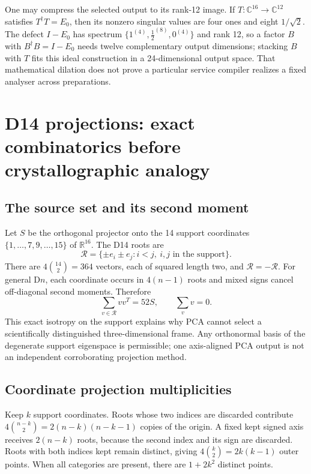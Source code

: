 \documentclass[11pt,a4paper]{article}
\begin{document}
One may compress the selected output to its rank-12 image. If $T:\mathbb C^{16}\to\mathbb C^{12}$ satisfies $T^\dagger T=E_0$, then its nonzero singular values are four ones and eight $1/\sqrt2$. The defect $I-E_0$ has spectrum $\{1^{(4)},\tfrac12^{(8)},0^{(4)}\}$ and rank 12, so a factor $B$ with $B^\dagger B=I-E_0$ needs twelve complementary output dimensions; stacking $B$ with $T$ fits this ideal construction in a 24-dimensional output space. That mathematical dilation does not prove a particular service compiler realizes a fixed analyser across preparations.

\section{D14 projections: exact combinatorics before crystallographic analogy}
\subsection{The source set and its second moment}
Let $S$ be the orthogonal projector onto the 14 support coordinates $\{1,\ldots,7,9,\ldots,15\}$ of $\mathbb R^{16}$. The D14 roots are
\begin{equation}
\mathcal R=\{\pm e_i\pm e_j:i<j,\ i,j\text{ in the support}\}.
\end{equation}
There are $4\binom{14}{2}=364$ vectors, each of squared length two, and $\mathcal R=-\mathcal R$. For general D$n$, each coordinate occurs in $4(n-1)$ roots and mixed signs cancel off-diagonal second moments. Therefore
\begin{equation}\label{eq:moment}
\sum_{v\in\mathcal R}vv^T=52S,\qquad \sum_vv=0.
\end{equation}
This exact isotropy on the support explains why PCA cannot select a scientifically distinguished three-dimensional frame. Any orthonormal basis of the degenerate support eigenspace is permissible; one axis-aligned PCA output is not an independent corroborating projection method.

\subsection{Coordinate projection multiplicities}
Keep $k$ support coordinates. Roots whose two indices are discarded contribute
$4\binom{n-k}{2}=2(n-k)(n-k-1)$ copies of the origin. A fixed kept signed axis receives $2(n-k)$ roots, because the second index and its sign are discarded. Roots with both indices kept remain distinct, giving $4\binom{k}{2}=2k(k-1)$ outer points. When all categories are present, there are $1+2k^2$ distinct points.
\end{document}
